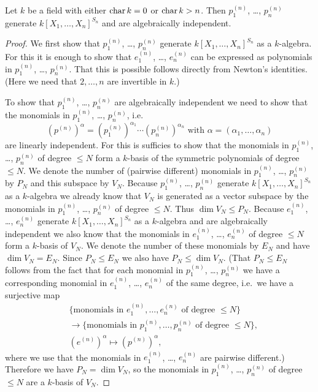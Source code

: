 \begin{thrm}
 Let $k$ be a field with either $\operatorname{char} k = 0$ or $\operatorname{char} k > n$. Then $p^{(n)}_1$, \dots, $p^{(n)}_n$ generate $k[X_1, \dotsc, X_n]^{S_n}$ and are algebraically independent.
\end{thrm}
\begin{proof}
 We first show that $p^{(n)}_1$, \dots, $p^{(n)}_n$ generate $k[X_1, \dotsc, X_n]^{S_n}$ as a $k$-algebra. For this it is enough to show that $e^{(n)}_1$, \dots, $e^{(n)}_n$ can be expressed as polynomials in $p^{(n)}_1$, \dots, $p^{(n)}_n$. That this is possible follows directly from Newton’s identities. (Here we need that $2, \dotsc, n$ are invertible in $k$.)
 
 To show that $p^{(n)}_1$, \dots, $p^{(n)}_n$ are algebraically independent we need to show that the monomials in $p^{(n)}_1$, \dots, $p^{(n)}_n$, i.e.
 \[
  \left(p^{(n)}\right)^\alpha = \left(p^{(n)}_1\right)^{\alpha_1} \dotsm \left(p^{(n)}_n\right)^{\alpha_n} \text{ with } \alpha = (\alpha_1, \dotsc, \alpha_n)
 \]
 are linearly independent. For this is sufficies to show that the monomials in $p^{(n)}_1$, \dots, $p^{(n)}_n$ of degree $\leq N$ form a $k$-basis of the symmetric polynomials of degree $\leq N$. We denote the number of (pairwise different) monomials in $p^{(n)}_1$, \dots, $p^{(n)}_n$ by $P_N$ and this subspace by $V_N$. Because $p^{(n)}_1$, \dots, $p^{(n)}_n$ generate $k[X_1, \dotsc, X_n]^{S_n}$ as a $k$-algebra we already know that $V_N$ is generated as a vector subspace by the monomials in $p^{(n)}_1$, \dots, $p^{(n)}_n$ of degree $\leq N$. Thus $\dim V_N \leq P_N$. Because $e^{(n)}_1$, \dots, $e^{(n)}_n$ generate $k[X_1, \dotsc, X_n]^{S_n}$ as a $k$-algebra and are algebraically independent we also know that the monomials in $e^{(n)}_1$, \dots, $e^{(n)}_n$ of degree $\leq N$ form a $k$-basis of $V_N$. We denote the number of these monomials by $E_N$ and have $\dim V_N = E_N$. Since $P_N \leq E_N$ we also have $P_N \leq \dim V_N$. (That $P_N \leq E_N$ follows from the fact that for each monomial in $p^{(n)}_1$, \dots, $p^{(n)}_n$ we have a corresponding monomial in $e^{(n)}_1$, \dots, $e^{(n)}_n$ of the same degree, i.e.\ we have a surjective map
\begin{align*}
    &\, \{\text{monomials in $e^{(n)}_1, \dotsc, e^{(n)}_n$ of degree $\leq N$}\} \\
    &\, \to \{\text{monomials in $p^{(n)}_1, \dotsc, p^{(n)}_n$ of degree $\leq N$}\}, \\
    &\, \left(e^{(n)}\right)^\alpha \mapsto \left(p^{(n)}\right)^\alpha,
\end{align*}
where we use that the monomials in $e^{(n)}_1$, \dots, $e^{(n)}_n$ are pairwise different.)
Therefore we have $P_N = \dim V_N$, so the monomials in $p^{(n)}_1$, \dots, $p^{(n)}_n$ of degree $\leq N$ are a $k$-basis of $V_N$.
\end{proof}



